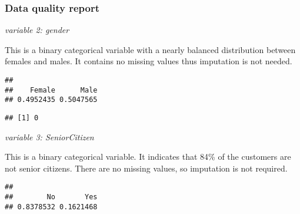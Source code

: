 \documentclass[
  a4paper]{article}
\newenvironment{Shaded}{\begin{snugshade}}{\end{snugshade}}
\newcommand{\CommentTok}[1]{\textcolor[rgb]{0.56,0.35,0.01}{\textit{#1}}}
\newcommand{\FunctionTok}[1]{\textcolor[rgb]{0.13,0.29,0.53}{\textbf{#1}}}
\newcommand{\NormalTok}[1]{#1}
\newcommand{\SpecialCharTok}[1]{\textcolor[rgb]{0.81,0.36,0.00}{\textbf{#1}}}
\begin{document}
\hypertarget{data-quality-report}{%
\subsubsection{Data quality report}\label{data-quality-report}}

\emph{variable 2: gender}

This is a binary categorical variable with a nearly balanced
distribution between females and males. It contains no missing values
thus imputation is not needed.

\begin{Shaded}
\end{Shaded}

\begin{verbatim}
## 
##    Female      Male 
## 0.4952435 0.5047565
\end{verbatim}

\begin{Shaded}
\end{Shaded}

\begin{verbatim}
## [1] 0
\end{verbatim}

\emph{variable 3: SeniorCitizen}

This is a binary categorical variable. It indicates that 84\% of the
customers are not senior citizens. There are no missing values, so
imputation is not required.

\begin{Shaded}
\end{Shaded}

\begin{verbatim}
## 
##        No       Yes 
## 0.8378532 0.1621468
\end{verbatim}
\end{document}
